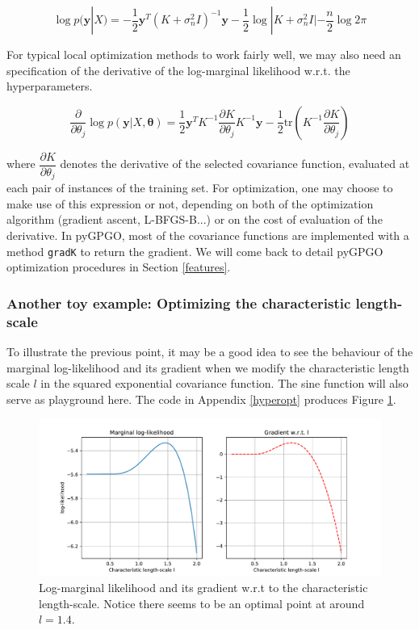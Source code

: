 \documentclass[10pt,a4paper,twoside]{book}
\begin{document}
\begin{equation}
\log p(\boldsymbol{y}|X) = - \dfrac{1}{2}\boldsymbol{y}^T(K + \sigma^2_n I)^{-1}\boldsymbol{y} - \dfrac{1}{2}\log |K + \sigma^2_n I| - \dfrac{n}{2}\log 2\pi
\end{equation}

For typical local optimization methods to work fairly well, we may also need an specification of the derivative of the log-marginal likelihood w.r.t. the hyperparameters.

\begin{equation}
\dfrac{\partial}{\partial \theta_j}\log p(\boldsymbol{y}|X, \boldsymbol{\theta}) = \dfrac{1}{2}\boldsymbol{y}^T K^{-1}\dfrac{\partial K}{\partial \theta_j}K^{-1}\boldsymbol{y} - \dfrac{1}{2}\textrm{tr}\left(K^{-1} \dfrac{\partial K}{\partial \theta_j} \right)
\end{equation}

where $\dfrac{\partial K}{\partial \theta_j}$ denotes the derivative of the selected covariance function, evaluated at each pair of instances of the training set. For optimization, one may choose to make use of this expression or not, depending on both of the optimization algorithm (gradient ascent, L-BFGS-B...) or on the cost of evaluation of the derivative. In pyGPGO, most of the covariance functions are implemented with a method \texttt{gradK} to return the gradient. We will come back to detail pyGPGO optimization procedures in Section \ref{features}. 

\subsubsection{Another toy example: Optimizing the characteristic length-scale}

To illustrate the previous point, it may be a good idea to see the behaviour of the marginal log-likelihood and its gradient when we modify the characteristic length scale $l$ in the squared exponential covariance function. The sine function will also serve as playground here. The code in Appendix \ref{hyperopt} produces Figure \ref{fig:logmarginal}.


\begin{figure}
\caption{Log-marginal likelihood and its gradient w.r.t to the characteristic length-scale. Notice there seems to be an optimal point at around $l = 1.4$.}
\label{fig:logmarginal}
\includegraphics[width=\textwidth]{figures/chapter2/logmarginal}
\end{figure}
\end{document}
